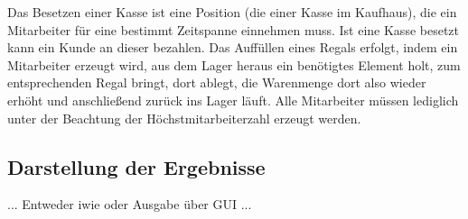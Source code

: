 Das Besetzen einer Kasse ist eine Position (die einer Kasse im Kaufhaus), die ein Mitarbeiter für eine bestimmt Zeitspanne einnehmen muss. Ist eine Kasse besetzt kann ein Kunde an dieser bezahlen. Das Auffüllen eines Regals erfolgt, indem ein Mitarbeiter erzeugt wird, aus dem Lager heraus ein benötigtes Element holt, zum entsprechenden Regal bringt, dort ablegt, die Warenmenge dort also wieder erhöht und anschließend zurück ins Lager läuft. Alle Mitarbeiter müssen lediglich unter der Beachtung der Höchstmitarbeiterzahl erzeugt werden.

\subsection{Darstellung der Ergebnisse}
... Entweder iwie oder Ausgabe über GUI ...